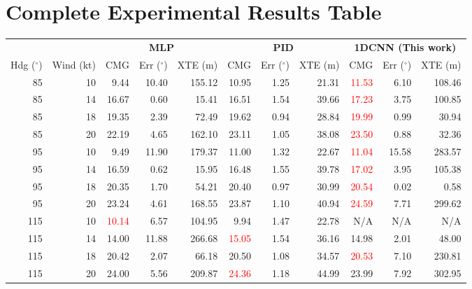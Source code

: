 \section{Complete Experimental Results Table}
\label{sec:vmg}

\begin{table}[H]
\centering
\footnotesize
\setlength{\tabcolsep}{3.5pt}
\renewcommand{\arraystretch}{0.88}
\begin{tabular}{@{}rr rrr rrr rrr@{}}
\toprule
& & \multicolumn{3}{c}{\textbf{MLP}} & \multicolumn{3}{c}{\textbf{PID}} & \multicolumn{3}{c}{\textbf{1DCNN (This work)}} \\
\cmidrule(lr){3-5} \cmidrule(lr){6-8} \cmidrule(lr){9-11}
Hdg ($^\circ$) & Wind (kt) & CMG & Err ($^\circ$) & XTE (m) & CMG & Err ($^\circ$) & XTE (m) & CMG & Err ($^\circ$) & XTE (m) \\
\midrule
85  & 10 &  9.44 & 10.40 & 155.12 & 10.95 & 1.25 & 21.31 & \textcolor{red}{11.53} &  6.10 & 108.46 \\
85  & 14 & 16.67 &  0.60 &  15.41 & 16.51 & 1.54 & 39.66 & \textcolor{red}{17.23} &  3.75 & 100.85 \\
85  & 18 & 19.35 &  2.39 &  72.49 & 19.62 & 0.94 & 28.84 & \textcolor{red}{19.99} &  0.99 &  30.94 \\
85  & 20 & 22.19 &  4.65 & 162.10 & 23.11 & 1.05 & 38.08 & \textcolor{red}{23.50} &  0.88 &  32.36 \\
\midrule
95  & 10 &  9.49 & 11.90 & 179.37 & 11.00 & 1.32 & 22.67 & \textcolor{red}{11.04} & 15.58 & 283.57 \\
95  & 14 & 16.59 &  0.62 &  15.95 & 16.48 & 1.55 & 39.78 & \textcolor{red}{17.02} &  3.95 & 105.38 \\
95  & 18 & 20.35 &  1.70 &  54.21 & 20.40 & 0.97 & 30.99 & \textcolor{red}{20.54} &  0.02 &   0.58 \\
95  & 20 & 23.24 &  4.61 & 168.55 & 23.87 & 1.10 & 40.94 & \textcolor{red}{24.59} &  7.71 & 299.62 \\
\midrule
115 & 10 & \textcolor{red}{10.14} &  6.57 & 104.95 &  9.94 & 1.47 & 22.78 & N/A   & N/A   & N/A    \\
115 & 14 & 14.00 & 11.88 & 266.68 & \textcolor{red}{15.05} & 1.54 & 36.16 & 14.98 &  2.01 &  48.00 \\
115 & 18 & 20.42 &  2.07 &  66.18 & 20.50 & 1.08 & 34.57 & \textcolor{red}{20.53} &  7.10 & 230.81 \\
115 & 20 & 24.00 &  5.56 & 209.87 & \textcolor{red}{24.36} & 1.18 & 44.99 & 23.99 &  7.92 & 302.95 \\

\end{tabular}
\end{table}
